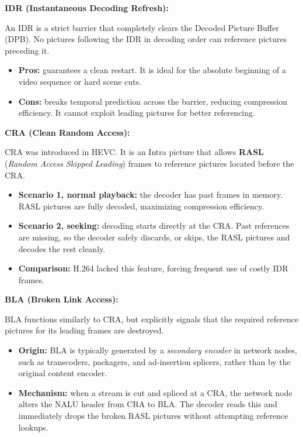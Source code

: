 \textbf{IDR (Instantaneous Decoding Refresh):}

An IDR is a strict barrier that completely clears the Decoded Picture Buffer (DPB). No pictures following the IDR in decoding order can reference pictures preceding it.

\begin{itemize}
\item \textbf{Pros:} guarantees a clean restart. It is ideal for the absolute beginning of a video sequence or hard scene cuts.
\item \textbf{Cons:} breaks temporal prediction across the barrier, reducing compression efficiency. It cannot exploit leading pictures for better referencing.
\end{itemize}

\textbf{CRA (Clean Random Access):}

CRA was introduced in HEVC. It is an Intra picture that allows \textbf{RASL} (\textit{Random Access Skipped Leading}) frames to reference pictures located before the CRA.

\begin{itemize}
\item \textbf{Scenario 1, normal playback:} the decoder has past frames in memory. RASL pictures are fully decoded, maximizing compression efficiency.
\item \textbf{Scenario 2, seeking:} decoding starts directly at the CRA. Past references are missing, so the decoder safely discards, or skips, the RASL pictures and decodes the rest cleanly.
\item \textbf{Comparison:} H.264 lacked this feature, forcing frequent use of costly IDR frames.
\end{itemize}

\textbf{BLA (Broken Link Access):}

BLA functions similarly to CRA, but explicitly signals that the required reference pictures for its leading frames are destroyed.

\begin{itemize}
\item \textbf{Origin:} BLA is typically generated by a \textit{secondary encoder} in network nodes, such as transcoders, packagers, and ad-insertion splicers, rather than by the original content encoder.
\item \textbf{Mechanism:} when a stream is cut and spliced at a CRA, the network node alters the NALU header from CRA to BLA. The decoder reads this and immediately drops the broken RASL pictures without attempting reference lookups.
\end{itemize}

